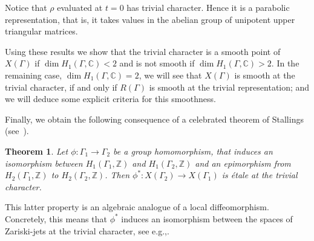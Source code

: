 \documentclass[11pt]{article}
\newcommand{\eg}{e.g.,\xspace}
\newtheorem{theorem}{Theorem}[section]
\theoremstyle{definition}
\newcommand{\ZZ}{\mathbb{Z}}
\newcommand{\CC}{\mathbb{C}}
\begin{document}
Notice that $\rho$ evaluated at $t=0$ has trivial character. Hence it is a parabolic representation, that is, it takes values in the abelian group of unipotent upper triangular matrices.

Using these results we show that the trivial character is a smooth
point of $X(\Gamma)$ if $\dim H_1(\Gamma,\CC)<2$ and is not smooth
if $\dim H_1(\Gamma,\CC)>2$. In the remaining case, $\dim H_1(\Gamma,\CC)=2$,
we will see that $X(\Gamma)$ is smooth at the trivial character, if and only
if $R(\Gamma)$ is smooth at the trivial representation; and we will deduce
some explicit criteria for this smoothness.

Finally, we obtain the following consequence of a
celebrated theorem of Stallings (see~\cite{Stallings}).
\begin{theorem}\label{theo:etale}
Let $\phi\colon \Gamma_1\to \Gamma_2$ be a group homomorphism, that
induces an isomorphism between $H_1(\Gamma_1,\ZZ)$ and $H_1(\Gamma_2,\ZZ)$
and an epimorphism from $H_2(\Gamma_1,\ZZ)$ to $H_2(\Gamma_2,\ZZ)$. Then
$\phi^*\colon X(\Gamma_2)\to X(\Gamma_1)$ is étale at the trivial
character.
\end{theorem}
This latter property is an algebraic analogue of a local diffeomorphism.
Concretely, this means that $\phi^*$ induces an isomorphism between the
spaces of Zariski-jets at the trivial character,
see \eg \cite[Chap.\,4, Prop.\,3.26]{Liu}.
\end{document}
